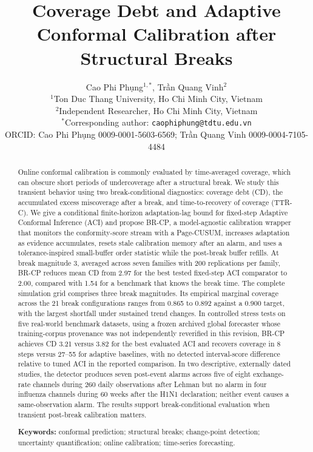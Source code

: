 \documentclass[10pt]{article}
\title{\bfseries Coverage Debt and Adaptive Conformal Calibration after Structural Breaks}
\author{{\fontencoding{T5}\selectfont Cao Phi Phụng}$^{1,*}$, {\fontencoding{T5}\selectfont Trần Quang Vinh}$^{2}$\\
\small $^{1}$Ton Duc Thang University, Ho Chi Minh City, Vietnam\\
\small $^{2}$Independent Researcher, Ho Chi Minh City, Vietnam\\
\small $^{*}$Corresponding author: \texttt{caophiphung@tdtu.edu.vn}\\
\small ORCID: {\fontencoding{T5}\selectfont Cao Phi Phụng} 0009-0001-5603-6569; {\fontencoding{T5}\selectfont Trần Quang Vinh} 0009-0004-7105-4484}
\date{}
\newcommand{\brcp}{\textsc{BR-CP}}
\begin{document}
\maketitle

\begin{abstract}
Online conformal calibration is commonly evaluated by time-averaged coverage, which can obscure short periods of undercoverage after a structural break. We study this transient behavior using two break-conditional diagnostics: coverage debt (CD), the accumulated excess miscoverage after a break, and time-to-recovery of coverage (TTR-C). We give a conditional finite-horizon adaptation-lag bound for fixed-step Adaptive Conformal Inference (ACI) and propose \brcp{}, a model-agnostic calibration wrapper that monitors the conformity-score stream with a Page-CUSUM, increases adaptation as evidence accumulates, resets stale calibration memory after an alarm, and uses a tolerance-inspired small-buffer order statistic while the post-break buffer refills. At break magnitude 3, averaged across seven families with 200 replications per family, \brcp{} reduces mean CD from 2.97 for the best tested fixed-step ACI comparator to 2.00, compared with 1.54 for a benchmark that knows the break time. The complete simulation grid comprises three break magnitudes. Its empirical marginal coverage across the 21 break configurations ranges from 0.865 to 0.892 against a 0.900 target, with the largest shortfall under sustained trend changes. In controlled stress tests on five real-world benchmark datasets, using a frozen archived global forecaster whose training-corpus provenance was not independently reverified in this revision, \brcp{} achieves CD 3.21 versus 3.82 for the best evaluated ACI and recovers coverage in 8 steps versus 27--55 for adaptive baselines, with no detected interval-score difference relative to tuned ACI in the reported comparison. In two descriptive, externally dated studies, the detector produces seven post-event alarms across five of eight exchange-rate channels during 260 daily observations after Lehman but no alarm in four influenza channels during 60 weeks after the H1N1 declaration; neither event causes a same-observation alarm. The results support break-conditional evaluation when transient post-break calibration matters.

\smallskip
\noindent\textbf{Keywords:} conformal prediction; structural breaks; change-point detection; uncertainty quantification; online calibration; time-series forecasting.
\end{abstract}
\end{document}
